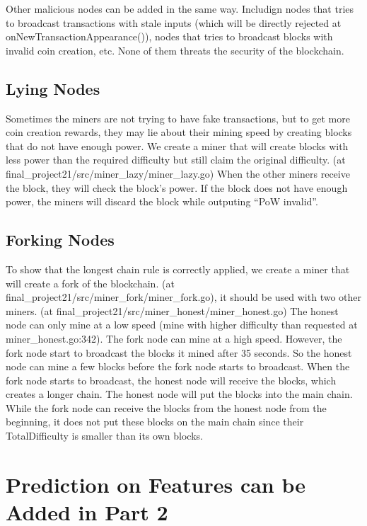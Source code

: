 \documentclass[12pt]{article}
\begin{document}
Other malicious nodes can be added in the same way. Includign nodes that tries to broadcast transactions with stale inputs (which will be directly rejected at onNewTransactionAppearance()), nodes that tries to broadcast blocks with invalid coin creation, etc.
None of them threats the security of the blockchain.

\subsection{Lying Nodes}

Sometimes the miners are not trying to have fake transactions, but to get more coin creation rewards, they may lie about their mining speed by creating blocks that do not have enough power.
We create a miner that will create blocks with less power than the required difficulty but still claim the original difficulty. (at final\_project21/src/miner\_lazy/miner\_lazy.go)
When the other miners receive the block, they will check the block's power. If the block does not have enough power, the miners will discard the block while outputing ``PoW invalid''.

\subsection{Forking Nodes}

To show that the longest chain rule is correctly applied, we create a miner that will create a fork of the blockchain. (at final\_project21/src/miner\_fork/miner\_fork.go), it should be used with two other miners. (at final\_project21/src/miner\_honest/miner\_honest.go)
The honest node can only mine at a low speed (mine with higher difficulty than requested at miner\_honest.go:342). The fork node can mine at a high speed. However, the fork node start to broadcast the blocks it mined after 35 seconds. So the honest node can mine a few blocks before the fork node starts to broadcast.
When the fork node starts to broadcast, the honest node will receive the blocks, which creates a longer chain. The honest node will put the blocks into the main chain. While the fork node can receive the blocks from the honest node from the beginning, it does not put these blocks on the main chain since their TotalDifficulty is smaller than its own blocks.

\section{Prediction on Features can be Added in Part 2}
\end{document}
